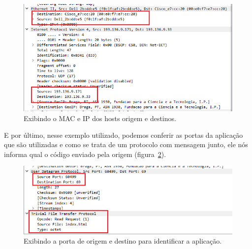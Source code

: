 \documentclass{llncs}
\begin{document}
\begin{enumerate}[\textbf{b)}]
\begin{flushleft}
      \begin{figure}[h]
        \includegraphics[scale=0.65]{pdu02.png}
        \centering
        \caption{Exibindo o MAC e IP dos hosts origem e destinos.}
        \label{fig:pdu02}
      \end{figure} 
    \end{flushleft}

    \begin{flushleft}
      \par E por último, nesse exemplo utilizado, podemos conferir as portas da aplicação que são utilizadas e como se trata de um protocolo com mensagem junto, ele nós informa qual o código enviado pela origem (figura~\ref{fig:pdu03}).
      \begin{figure}[h]
        \includegraphics[scale=0.65]{pdu03.png}
        \centering
        \caption{Exibindo a porta de origem e destino para identificar a aplicação.}
        \label{fig:pdu03}
      \end{figure} 
    \end{flushleft}


\end{enumerate}
\end{document}
